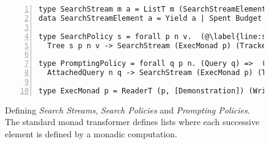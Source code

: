\begin{figure}
\begin{lncodebox}
\begin{lstlisting}[style=haskell, numbers=left]
type SearchStream m a = ListT m (SearchStreamElement a)  (@\label{line:search-stream}@)
data SearchStreamElement a = Yield a | Spent Budget | Barrier Budget  (@\label{line:search-stream-element}@)

type SearchPolicy s = forall p n v.  (@\label{line:search-policy}@)
  Tree s p n v -> SearchStream (ExecMonad p) (Tracked n v)

type PromptingPolicy = forall q p n. (Query q) =>  (@\label{line:prompting-policy}@)
  AttachedQuery n q -> SearchStream (ExecMonad p) (Tracked n (QResult q))

type ExecMonad p = ReaderT (p, [Demonstration]) (WriterT Trace IO)  (@\label{line:exec-monad}@)
\end{lstlisting}
\end{lncodebox}
\vspace{-0.3cm}
\caption{Defining \emph{Search Streams}, \emph{Search Policies} and \emph{Prompting Policies}. The standard  monad transformer defines lists where each successive element is defined by a monadic computation.}\label{fig:streams}
\end{figure}
